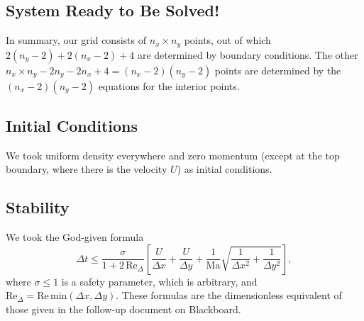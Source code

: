 \documentclass[11pt]{article}
\newcommand{\Ma}{\text{Ma}}
\newcommand{\Rey}{\text{Re}}
\begin{document}
\subsection{System Ready to Be Solved!}

In summary, our grid consists of $n_x \times n_y$ points, out of which $2(n_y - 2) + 2(n_x -2) + 4$ are determined by boundary conditions. The other $n_x \times n_y - 2n_y - 2n_x + 4 = (n_x - 2)(n_y - 2)$ points are determined by the $(n_x - 2)(n_y - 2)$ equations for the interior points.

\subsection{Initial Conditions}

We took uniform density everywhere and zero momentum (except at the top boundary, where there is the velocity $U$) as initial conditions.

\subsection{Stability}

We took the God-given formula
\begin{equation}
 \Delta t \leq \frac{\sigma}{1 + 2\,\Rey_\Delta}\left[ \frac{U}{\Delta x} + \frac{U}{\Delta y} + \frac{1}{\Ma}\sqrt{\frac{1}{\Delta x^2} + \frac{1}{\Delta y^2}} \right],
\end{equation}
where $\sigma \leq 1$ is a safety parameter, which is arbitrary, and $\Rey_\Delta = \Rey\,\text{min}(\Delta x, \Delta y)$. These formulas are the dimensionless equivalent of those given in the follow-up document on Blackboard.
\end{document}

